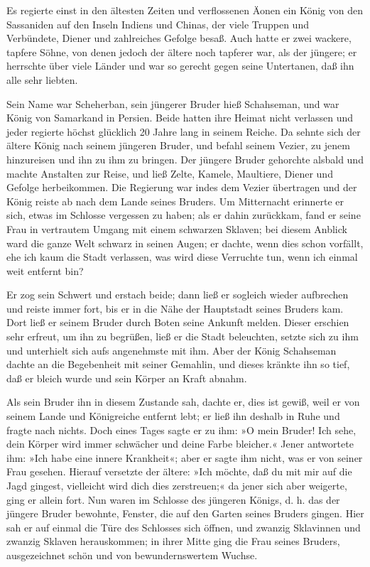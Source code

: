 \documentclass[DIV=16,twocolumn]{scrartcl}
\begin{document}
Es regierte einst in den ältesten Zeiten und verflossenen Äonen ein König von den Sassaniden auf den Inseln Indiens und Chinas, der viele Truppen und Verbündete, Diener und zahlreiches Gefolge besaß. Auch hatte er zwei wackere, tapfere Söhne, von denen jedoch der ältere noch tapferer war, als der jüngere; er herrschte über viele Länder und war so gerecht gegen seine Untertanen, daß ihn alle sehr liebten.
  
Sein Name war Scheherban, sein jüngerer Bruder hieß Schahseman, und war König von Samarkand in Persien. Beide hatten ihre Heimat nicht verlassen und jeder regierte höchst glücklich 20 Jahre lang in seinem Reiche. Da sehnte sich der ältere König nach seinem jüngeren Bruder, und befahl seinem Vezier, zu jenem hinzureisen und ihn zu ihm zu bringen. Der jüngere Bruder gehorchte alsbald und machte Anstalten zur Reise, und ließ Zelte, Kamele, Maultiere, Diener und Gefolge herbeikommen. Die Regierung war indes dem Vezier übertragen und der König reiste ab nach dem Lande seines Bruders. Um Mitternacht erinnerte er sich, etwas im Schlosse vergessen zu haben; als er dahin zurückkam, fand er seine Frau in vertrautem Umgang mit einem schwarzen Sklaven; bei diesem Anblick ward die ganze Welt schwarz in seinen Augen; er dachte, wenn dies schon vorfällt, ehe ich kaum die Stadt verlassen, was wird diese Verruchte tun, wenn ich einmal weit entfernt bin?

Er zog sein Schwert und erstach beide; dann ließ er sogleich wieder aufbrechen und reiste immer fort, bis er in die Nähe der Hauptstadt seines Bruders kam. Dort ließ er seinem Bruder durch Boten seine Ankunft melden. Dieser erschien sehr erfreut, um ihn zu begrüßen, ließ er die Stadt beleuchten, setzte sich zu ihm und unterhielt sich aufs angenehmste mit ihm. Aber der König Schahseman dachte an die Begebenheit mit seiner Gemahlin, und dieses kränkte ihn so tief, daß er bleich wurde und sein Körper an Kraft abnahm.

Als sein Bruder ihn in diesem Zustande sah, dachte er, dies ist gewiß, weil er von seinem Lande und Königreiche entfernt lebt; er ließ ihn deshalb in Ruhe und fragte nach nichts. Doch eines Tages sagte er zu ihm: »O mein Bruder! Ich sehe, dein Körper wird immer schwächer und deine Farbe bleicher.« Jener antwortete ihm: »Ich habe eine innere Krankheit«; aber er sagte ihm nicht, was er von seiner Frau gesehen. Hierauf versetzte der ältere: »Ich möchte, daß du mit mir auf die Jagd gingest, vielleicht wird dich dies zerstreuen;« da jener sich aber weigerte, ging er allein fort. Nun waren im Schlosse des jüngeren Königs, d. h. das der jüngere Bruder bewohnte, Fenster, die auf den Garten seines Bruders gingen. Hier sah er auf einmal die Türe des Schlosses sich öffnen, und zwanzig Sklavinnen und zwanzig Sklaven herauskommen; in ihrer Mitte ging die Frau seines Bruders, ausgezeichnet schön und von bewundernswertem Wuchse.
\end{document}
